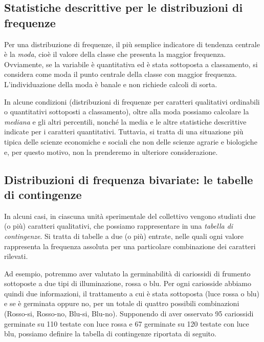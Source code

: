 \documentclass[a4paper,12pt,oneside]{book}
\begin{document}
\hypertarget{statistiche-descrittive-per-le-distribuzioni-di-frequenze}{%
\subsection{Statistiche descrittive per le distribuzioni di frequenze}\label{statistiche-descrittive-per-le-distribuzioni-di-frequenze}}

Per una distribuzione di frequenze, il più semplice indicatore di tendenza centrale è la \emph{moda}, cioè il valore della classe che presenta la maggior frequenza. Ovviamente, se la variabile è quantitativa ed è stata sottoposta a classamento, si considera come moda il punto centrale della classe con maggior frequenza. L'individuazione della moda è banale e non richiede calcoli di sorta.

In alcune condizioni (distribuzioni di frequenze per caratteri qualitativi ordinabili o quantitativi sottoposti a classamento), oltre alla moda possiamo calcolare la \emph{mediana} e gli altri percentili, nonché la media e le altre statistiche descrittive indicate per i caratteri quantitativi. Tuttavia, si tratta di una situazione più tipica delle scienze economiche e sociali che non delle scienze agrarie e biologiche e, per questo motivo, non la prenderemo in ulteriore considerazione.

\hypertarget{distribuzioni-di-frequenza-bivariate-le-tabelle-di-contingenze}{%
\subsection{Distribuzioni di frequenza bivariate: le tabelle di contingenze}\label{distribuzioni-di-frequenza-bivariate-le-tabelle-di-contingenze}}

In alcuni casi, in ciascuna unità sperimentale del collettivo vengono studiati due (o più) caratteri qualitativi, che possiamo rappresentare in una \emph{tabella di contingenze}. Si tratta di tabelle a due (o più) entrate, nelle quali ogni valore rappresenta la frequenza assoluta per una particolare combinazione dei caratteri rilevati.

Ad esempio, potremmo aver valutato la germinabilità di cariossidi di frumento sottoposte a due tipi di illuminazione, rossa o blu. Per ogni cariosside abbiamo quindi due informazioni, il trattamento a cui è stata sottoposta (luce rossa o blu) e se è germinata oppure no, per un totale di quattro possibili combinazioni (Rosso-si, Rosso-no, Blu-si, Blu-no). Supponendo di aver osservato 95 cariossidi germinate su 110 testate con luce rossa e 67 germinate su 120 testate con luce blu, possiamo definire la tabella di contingenze riportata di seguito.
\end{document}
